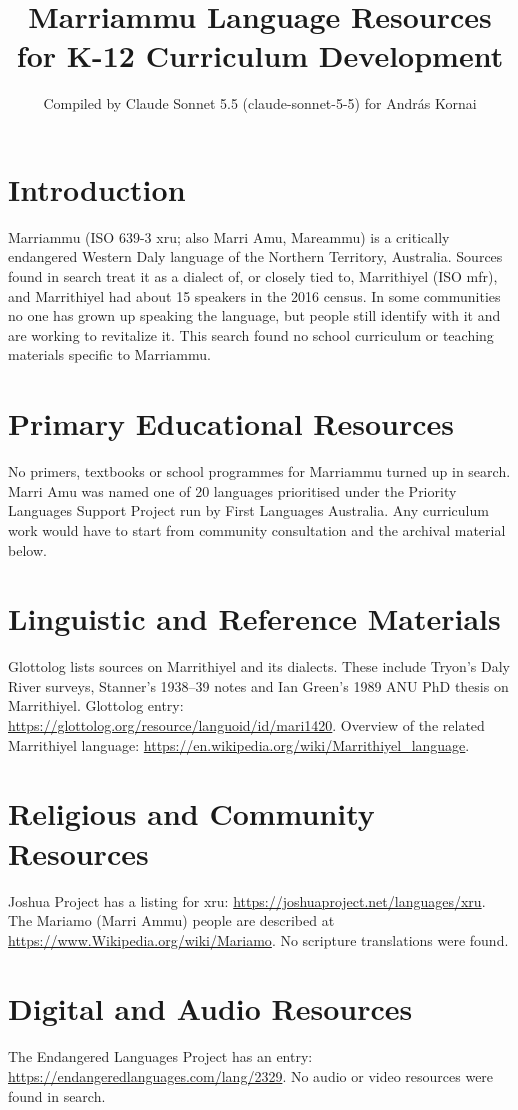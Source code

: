 \documentclass[12pt]{article}
\title{Marriammu Language Resources for K-12 Curriculum Development}
\author{Compiled by Claude Sonnet 5.5 (claude-sonnet-5-5) for Andr\'as Kornai}
\date{}
\begin{document}
\maketitle

\section{Introduction}
Marriammu (ISO 639-3 xru; also Marri Amu, Mareammu) is a critically endangered Western Daly language of the Northern Territory, Australia. Sources found in search treat it as a dialect of, or closely tied to, Marrithiyel (ISO mfr), and Marrithiyel had about 15 speakers in the 2016 census. In some communities no one has grown up speaking the language, but people still identify with it and are working to revitalize it. This search found no school curriculum or teaching materials specific to Marriammu.

\section{Primary Educational Resources}
No primers, textbooks or school programmes for Marriammu turned up in search. Marri Amu was named one of 20 languages prioritised under the Priority Languages Support Project run by First Languages Australia. Any curriculum work would have to start from community consultation and the archival material below.

\section{Linguistic and Reference Materials}
Glottolog lists sources on Marrithiyel and its dialects. These include Tryon's Daly River surveys, Stanner's 1938--39 notes and Ian Green's 1989 ANU PhD thesis on Marrithiyel. Glottolog entry: \url{https://glottolog.org/resource/languoid/id/mari1420}. Overview of the related Marrithiyel language: \url{https://en.wikipedia.org/wiki/Marrithiyel_language}.

\section{Religious and Community Resources}
Joshua Project has a listing for xru: \url{https://joshuaproject.net/languages/xru}. The Mariamo (Marri Ammu) people are described at \url{https://www.Wikipedia.org/wiki/Mariamo}. No scripture translations were found.

\section{Digital and Audio Resources}
The Endangered Languages Project has an entry: \url{https://endangeredlanguages.com/lang/2329}. No audio or video resources were found in search.
\end{document}

